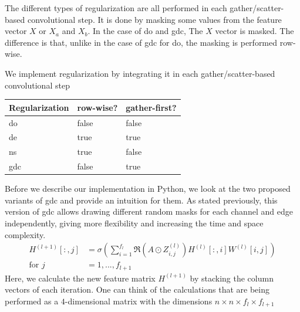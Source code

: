 The different types of regularization are all performed in each gather/scatter-based convolutional step. It is done by masking some values from the feature vector $X$ or $X_a$ and $X_b$.
In the case of \ac{do} and \ac{gdc}, The $X$ vector is masked.
The difference is that, unlike in the case of \ac{gdc} for \ac{do}, the masking is performed row-wise.





We implement regularization by integrating it in each gather/scatter-based convolutional step
\begin{center}
    \begin{tabular}{lll}
        \toprule
        \textbf{Regularization} & \textbf{row-wise?} & \textbf{gather-first?} \\
        \midrule
        \acf{do}                & false              & false                  \\
        \acf{de}                & true               & true                   \\
        \acf{ns}                & true               & false                  \\
        \acf{gdc}               & false              & true                   \\

        \bottomrule
    \end{tabular}
\end{center}

Before we describe our implementation in Python, we look at the two proposed variants of \ac{gdc} and provide an intuition for them.
As stated previously, this version of \ac{gdc} allows drawing different random masks for each channel and edge independently, giving more flexibility and increasing the time and space complexity.
\begin{equation}
    \begin{aligned}
        H^{(l+1)}[:,j] & = \sigma \left(\sum_{i=1}^{f_{l}}\mathfrak{R}\left(A \odot Z_{i,j}^{(l)}\right)H^{(l)}[:,i]W^{(l)}[i,j]\right) \\
        \text{for } j  & = 1,..., f_{l+1}
    \end{aligned}
\end{equation}
Here, we calculate the new feature matrix $H^{(l+1)}$ by stacking the column vectors of each iteration. One can think of the calculations that are being performed as a $4$-dimensional matrix with the dimensions $n\times n\times f_{l}\times f_{l+1}$

